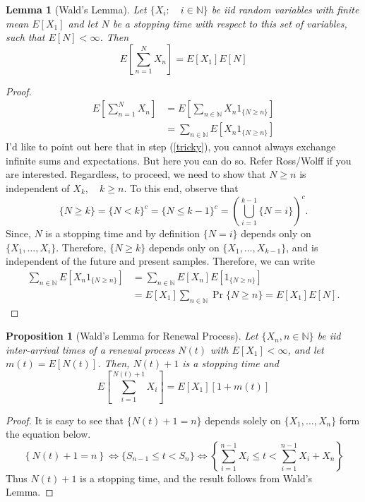 \documentclass[a4paper,10pt]{article}
\theoremstyle{plain}
\newtheorem{lem}[thm]{Lemma}
\newtheorem{prop}[thm]{Proposition}
\theoremstyle{definition}
\begin{document}
\begin{lem}[Wald's Lemma]
Let $\{X_i:\quad i\in \mathbb{N}\}$ be \emph{iid} random variables with finite mean $E[X_1]$ and let $N$ be a stopping time with respect to this set of variables, such that $E[N] < \infty$. Then
\[E\left[\sum_{n=1}^N X_n\right] = E[X_1]E[N]\]
\end{lem}
\begin{proof}
\begin{align}
E\left[\sum_{n=1}^N X_n\right] &= E\left[\sum_{n \in \mathbb{N}} X_n 1_{\{N \geq n\}}\right]  \\
&= \sum_{n \in \mathbb{N}} E\left[X_n 1_{\{N \geq n\}}\right] \label{tricky}
\end{align}
I'd like to point out here that in step (\ref{tricky}), you cannot always exchange infinite sums and expectations. But here you can do so. Refer Ross/Wolff if you are interested. Regardless, to proceed, we need to show that $N \geq n$ is independent of $X_k, \quad k \geq n$. To this end, observe that 
\begin{equation*}
\{N \geq k\} = \{N < k\}^c = \{N \leq k-1\}^c = \left(\bigcup_{i=1}^{k-1} \{N = i\}\right)^c. 
\end{equation*}
Since, $N$ is a stopping time and by definition $\{N=i\}$ depends only on $\{X_1,\ldots, X_i\}$. Therefore, $\{N \geq k\}$ depends only on $\{X_1,\ldots, X_{k-1}\}$, and is independent of the future and present samples. Therefore, we can write
\begin{align*}
\sum_{n \in \mathbb{N}} E\left[X_n 1_{\{N \geq n\}}\right] &= \sum_{n \in \mathbb{N}} E\left[X_n\right]E\left[ 1_{\{N \geq n\}}\right] \\
&= E\left[X_1\right] \sum_{n \in \mathbb{N}} \Pr\{N \geq n\} = E[X_1]E[N].
\end{align*} 
\end{proof}

\begin{prop}[Wald's Lemma for Renewal Process] \label{prop:WaldRenewal}
Let $\{X_n, n \in \mathbb{N}\}$ be \emph{iid} inter-arrival times of a renewal process $N(t)$ with $E[X_1] < \infty$, and let $m(t) = E[N(t)]$. Then, $N(t)+1$ is a stopping time and 
 \begin{equation*}
E\left[\sum_{i=1}^{N(t)+1}X_i\right] = E[X_1][1+m(t)]
\end{equation*}
\end{prop}
\begin{proof} It is easy to see that $\{N(t)+1=n\}$ depends solely on $\{X_1,\ldots,X_n\}$ form the equation below.
\begin{equation*}
\left\{N(t) + 1 = n \right\} \iff \{S_{n-1} \leq t < S_n\} \iff \left\{\sum_{i=1}^{n-1} X_i \leq t < \sum_{i=1}^{n-1} X_i + X_n\right\}
\end{equation*}
Thus $N(t)+1$ is a stopping time, and the result follows from Wald's Lemma.
\end{proof}
\end{document}
